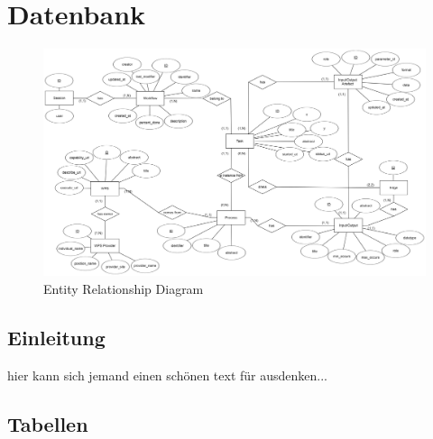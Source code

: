 \chapter{Datenbank}

    \begin{figure}[h]
        \centering
        \includegraphics[width=15cm]{diagrams/ERDiagramm.png}
        \caption{Entity Relationship Diagram}
        \label{fig:er_diagramm}
    \end{figure}
    
    
	\section{Einleitung}
	
	hier kann sich jemand einen schönen text für ausdenken...
	
	
	\section{Tabellen}
	
	      
